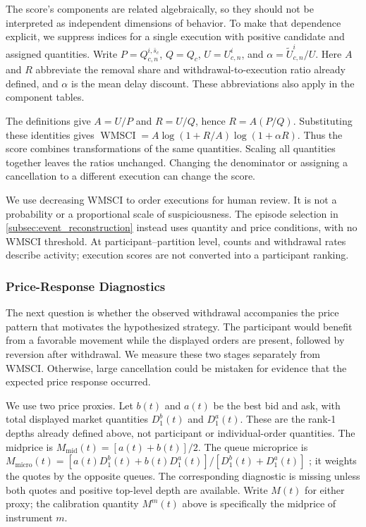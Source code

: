 \documentclass[11pt]{article}
\begin{document}
The score's components are related algebraically, so they should not be interpreted as independent dimensions of behavior. To make that dependence explicit, we suppress indices for a single execution with positive candidate and assigned quantities. Write $P=Q^{i,\bar{s}_c}_{c,n}$, $Q=Q_c$, $U=U^{i}_{c,n}$, and $\alpha=\widetilde U^{i}_{c,n}/U$. Here $A$ and $R$ abbreviate the removal share and withdrawal-to-execution ratio already defined, and $\alpha$ is the mean delay discount. These abbreviations also apply in the component tables.

The definitions give $A=U/P$ and $R=U/Q$, hence $R=A(P/Q)$. Substituting these identities gives $\operatorname{WMSCI}=A\log(1+R/A)\log(1+\alpha R)$. Thus the score combines transformations of the same quantities. Scaling all quantities together leaves the ratios unchanged. Changing the denominator or assigning a cancellation to a different execution can change the score.

We use decreasing WMSCI to order executions for human review. It is not a probability or a proportional scale of suspiciousness. The episode selection in \cref{subsec:event_reconstruction} instead uses quantity and price conditions, with no WMSCI threshold. At participant--partition level, counts and withdrawal rates describe activity; execution scores are not converted into a participant ranking.

\subsubsection{Price-Response Diagnostics}
\label{subsec:price_response_diagnostics}

The next question is whether the observed withdrawal accompanies the price pattern that motivates the hypothesized strategy. The participant would benefit from a favorable movement while the displayed orders are present, followed by reversion after withdrawal. We measure these two stages separately from WMSCI. Otherwise, large cancellation could be mistaken for evidence that the expected price response occurred.

We use two price proxies. Let $b(t)$ and $a(t)$ be the best bid and ask, with total displayed market quantities $D^b_1(t)$ and $D^a_1(t)$. These are the rank-1 depths already defined above, not participant or individual-order quantities. The midprice is $M_{\mathrm{mid}}(t)=[a(t)+b(t)]/2$. The queue microprice is $M_{\mathrm{micro}}(t)=[a(t)D^b_1(t)+b(t)D^a_1(t)]/[D^b_1(t)+D^a_1(t)]$ \cite{Stoikov02122018}; it weights the quotes by the opposite queues. The corresponding diagnostic is missing unless both quotes and positive top-level depth are available. Write $M(t)$ for either proxy; the calibration quantity $M^m(t)$ above is specifically the midprice of instrument $m$.
\end{document}
